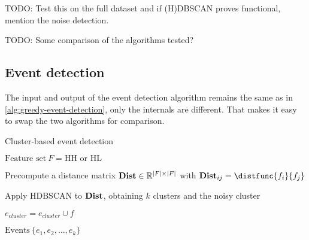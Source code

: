 {\color{red} TODO: Test this on the full dataset and if (H)DBSCAN proves functional, mention the noise detection.}

{\color{blue} TODO: Some comparison of the algorithms tested?}


\subsection{Event detection}
The input and output of the event detection algorithm remains the same as in \ref{alg:greedy-event-detection}, only the internals are different. That makes it easy to swap the two algorithms for comparison.

\begin{algorithm}[H]
\begin{algorithmic}[1]
\caption{Cluster-based event detection}
\Input $\text{Feature set} ~ F = \text{HH or HL}$

\State Precompute a distance matrix $\mathbf{Dist} \in \mathbb{R}^{\left\vert F \right\vert \times \left\vert F \right\vert}$ with $\distmat_{ij} = \distfunc{f_{i}}{f_{j}}$

\State Apply HDBSCAN to $\mathbf{Dist}$, obtaining $k$ clusters and the noisy cluster

		\State $e_{cluster} = e_{cluster} \cup f$
	\EndIf
\EndFor

\Output $\text{Events} ~ \{ e_{1}, e_{2}, \dots, e_{k} \}$
\end{algorithmic}
\end{algorithm}
